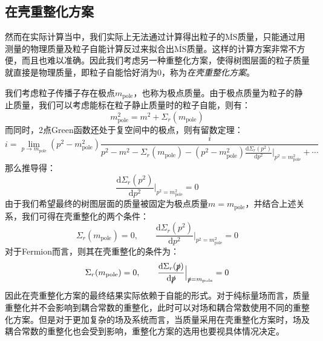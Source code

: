 \subsection{在壳重整化方案}
然而在实际计算当中，我们实际上无法通过计算得出粒子的$\overline{\text{MS}}$质量，只能通过用测量的物理质量及粒子自能计算反过来拟合出$\overline{\text{MS}}$质量。这样的计算方案非常不方便，而且也难以准确。因此我们考虑另一种重整化方案，使得树图层面的粒子质量就直接是物理质量，即粒子自能恰好消为0，称为\emph{在壳重整化方案}。


我们考虑粒子传播子存在极点$m_\text{pole}$，也称为极点质量。由于极点质量为粒子的静止质量，我们可以考虑能标在粒子静止质量时的粒子自能，则有：
\begin{equation}
    m^2_\text{pole}=m^2+\Sigma_r(m_\text{pole})
\end{equation}
而同时，2点Green函数还处于复空间中的极点，则有留数定理：
\begin{equation}
    i=\lim_{p\rightarrow m_\text{pole}}(p^2-m^2_\text{pole})\frac{i}{p^2-m^2-\Sigma_r(m_\text{pole})-(p^2-m^2_\text{pole})\frac{\mathrm{d}\Sigma_r(p^2)}{\mathrm{d}p^2}|_{p^2=m^2_\text{pole}}+\cdots}
\end{equation}
那么推导得：
\begin{equation}
    \frac{\mathrm{d}\Sigma_r(p^2)}{\mathrm{d}p^2}\Big|_{p^2=m^2_\text{pole}}=0
\end{equation}
由于我们希望最终的树图层面的质量被固定为极点质量$m=m_\text{pole}$，并结合上述关系，我们可得在壳重整化的两个条件：
\begin{equation}
    \Sigma_r(m_\text{pole})=0,\qquad\frac{\mathrm{d}\Sigma_r(p^2)}{\mathrm{d}p^2}\Big|_{p^2=m^2_\text{pole}}=0
\end{equation}
对于Fermion而言，则其在壳重整化的条件为：
\begin{equation}
    \Sigma_r(m_\text{pole})=0,\qquad\frac{\mathrm{d}\Sigma_r(\slashed{p})}{\mathrm{d}\slashed{p}}\Big|_{\slashed{p}=m_\text{pole}}=0
\end{equation}
因此在壳重整化方案的最终结果实际依赖于自能的形式。对于纯标量场而言，质量重整化并不会影响到耦合常数的重整化，此时可以对场和耦合常数使用不同的重整化方案。但是对于更加复杂的场及系统而言，当质量采用在壳重整化方案时，场及耦合常数的重整化也会受到影响，重整化方案的选用也要视具体情况决定。



